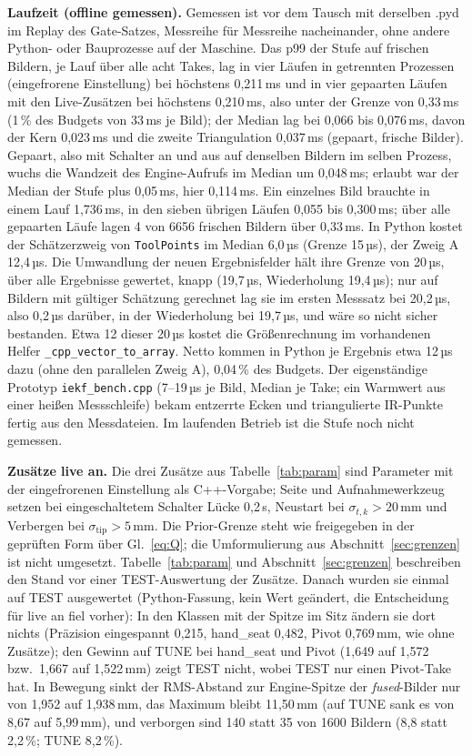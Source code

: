 \documentclass[11pt,a4paper,fleqn]{article}
\newcommand{\stip}{\sigma_{\mathrm{tip}}}
\newcommand{\code}[1]{\texttt{#1}}
\begin{document}
\textbf{Laufzeit (offline gemessen).} Gemessen ist vor dem Tausch mit derselben .pyd im Replay des Gate-Satzes,
Messreihe für Messreihe nacheinander, ohne andere Python- oder Bauprozesse auf der Maschine. Das p99 der Stufe auf
frischen Bildern, je Lauf über alle acht Takes, lag in vier Läufen in getrennten Prozessen (eingefrorene Einstellung)
bei höchstens 0,211\,ms und in vier gepaarten Läufen mit den Live-Zusätzen bei höchstens 0,210\,ms, also unter der
Grenze von 0,33\,ms (1\,\% des Budgets von 33\,ms je Bild); der Median lag bei 0,066 bis 0,076\,ms, davon der Kern
0,023\,ms und die zweite Triangulation 0,037\,ms (gepaart, frische Bilder). Gepaart, also mit Schalter an und aus auf
denselben Bildern im selben Prozess, wuchs die Wandzeit des Engine-Aufrufs im Median um 0,048\,ms; erlaubt war der
Median der Stufe plus 0,05\,ms, hier 0,114\,ms. Ein einzelnes Bild brauchte in einem Lauf 1,736\,ms, in den sieben
übrigen Läufen 0,055 bis 0,300\,ms; über alle gepaarten Läufe lagen 4 von 6656 frischen Bildern über 0,33\,ms. In
Python kostet der Schätzerzweig von \code{ToolPoints} im Median 6,0\,µs (Grenze 15\,µs), der Zweig A 12,4\,µs. Die
Umwandlung der neuen Ergebnisfelder hält ihre Grenze von 20\,µs, über alle Ergebnisse gewertet, knapp (19,7\,µs,
Wiederholung 19,4\,µs); nur auf Bildern mit gültiger Schätzung gerechnet lag sie im ersten Messsatz bei 20,2\,µs, also
0,2\,µs darüber, in der Wiederholung bei 19,7\,µs, und wäre so nicht sicher bestanden. Etwa 12 dieser 20\,µs kostet die
Größenrechnung im vorhandenen Helfer \code{\_cpp\_vector\_to\_array}. Netto kommen in Python je Ergebnis etwa
12\,µs dazu (ohne den parallelen Zweig A), 0,04\,\% des Budgets. Der eigenständige Prototyp \code{iekf\_bench.cpp}
(7--19\,µs je Bild, Median je Take; ein Warmwert aus einer heißen Messschleife) bekam entzerrte Ecken und
triangulierte IR-Punkte fertig aus den Messdateien. Im laufenden Betrieb ist die Stufe noch nicht gemessen.

\textbf{Zusätze live an.} Die drei Zusätze aus Tabelle~\ref{tab:param} sind Parameter mit der eingefrorenen
Einstellung als C++-Vorgabe; Seite und Aufnahmewerkzeug setzen bei eingeschaltetem Schalter Lücke 0,2\,s, Neustart bei
$\sigma_{t,k} > 20$\,mm und Verbergen bei $\stip > 5$\,mm. Die Prior-Grenze steht wie freigegeben in der geprüften Form
über Gl.~\eqref{eq:Q}; die Umformulierung aus Abschnitt~\ref{sec:grenzen} ist nicht umgesetzt.
Tabelle~\ref{tab:param} und Abschnitt~\ref{sec:grenzen} beschreiben den Stand vor einer TEST-Auswertung der Zusätze.
Danach wurden sie einmal auf TEST ausgewertet (Python-Fassung, kein Wert geändert, die Entscheidung für live an fiel
vorher): In den Klassen mit der Spitze im Sitz ändern sie dort nichts (Präzision eingespannt 0,215, hand\_seat 0,482,
Pivot 0,769\,mm, wie ohne Zusätze); den Gewinn auf TUNE bei hand\_seat und Pivot (1,649 auf 1,572 bzw.\ 1,667 auf
1,522\,mm) zeigt TEST nicht, wobei TEST nur einen Pivot-Take hat. In Bewegung sinkt der RMS-Abstand zur Engine-Spitze
der \emph{fused}-Bilder nur von 1,952 auf 1,938\,mm, das Maximum bleibt 11,50\,mm (auf TUNE sank es von 8,67 auf
5,99\,mm), und verborgen sind 140 statt 35 von 1600 Bildern (8,8 statt 2,2\,\%; TUNE 8,2\,\%).
\end{document}
